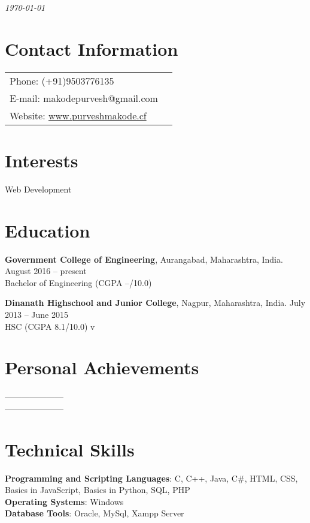 \documentclass[margin,line]{res}
\begin{document}
 \hfill {\em \today}

\begin{resume}
\section{\sc Contact Information}



\vspace{.08in}

\begin{tabular} {@{}p{3in}p{1in}}
             {Phone:}  (+91)9503776135 \\
		{E-mail:}  makodepurvesh@gmail.com\\
		 {Website:} \url{www.purveshmakode.cf}
\end{tabular}


\section{\sc Interests}

Web Development

\section{\sc Education}
{\bf Government College of Engineering}, Aurangabad, Maharashtra, India.\, \hfill  August 2016 -- present \\
Bachelor of Engineering \hfill(CGPA --/10.0)

{\bf Dinanath Highschool and Junior College}, Nagpur, Maharashtra, India.\,\,\hfill July 2013 -- June 2015\\
HSC \hfill(CGPA 8.1/10.0)
 v
\iffalse
\section{\sc Awards and Fellowships}
Award 1\\
Fellowship 1\\
\fi

\section{\sc Personal Achievements}
---------------------\\
---------------------
\section{\sc Technical Skills}
{\bf Programming and Scripting Languages}:  C, C++, Java, C\#, HTML, CSS, Basics in JavaScript,  Basics in Python, SQL, PHP\\
{\bf Operating Systems}: Windows\\
\iffalse
{\bf Tools}: Intel VTunes, GDB, Valgrind, Latex, Subversion, Crystal Reports, Informatica, Business Objects, IBM WebSphere Studio, MicroStrategy, Rational Rose Suite, Macromedia Dreamweaver,Adobe Photoshop \\
\fi
{\bf Database Tools}: Oracle, MySql, Xampp Server 

\end{resume}
\end{document}
